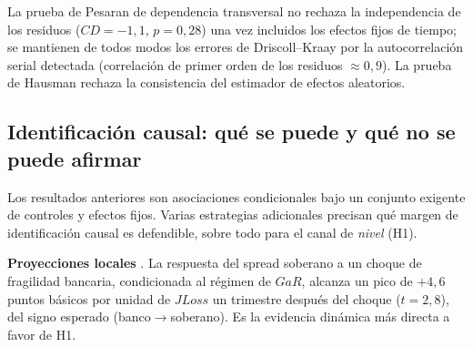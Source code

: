 La prueba de Pesaran \citep{Pesaran2021} de dependencia transversal no rechaza la independencia de los residuos ($CD=-1{,}1$, $p=0{,}28$) una vez incluidos los efectos fijos de tiempo; se mantienen de todos modos los errores de Driscoll–Kraay por la autocorrelación serial detectada (correlación de primer orden de los residuos $\approx 0{,}9$). La prueba de Hausman rechaza la consistencia del estimador de efectos aleatorios.

\subsection{Identificación causal: qué se puede y qué no se puede afirmar}\label{sec:ident-causal}

Los resultados anteriores son asociaciones condicionales bajo un conjunto exigente de controles y efectos fijos. Varias estrategias adicionales precisan qué margen de identificación causal es defendible, sobre todo para el canal de \emph{nivel} (H1).

\textbf{Proyecciones locales} \citep{Jorda2005}. La respuesta del spread soberano a un choque de fragilidad bancaria, condicionada al régimen de $GaR$, alcanza un pico de $+4{,}6$ puntos básicos por unidad de $JLoss$ un trimestre después del choque ($t=2{,}8$), del signo esperado (banco$\to$soberano). Es la evidencia dinámica más directa a favor de H1.

